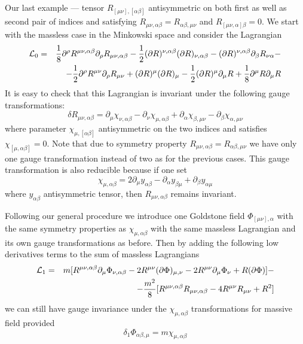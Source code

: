 \documentclass[a4paper,12pt]{article}
\begin{document}
Our last example --- tensor $R_{[\mu\nu],[\alpha\beta]}$ antisymmetric
on both first as well as second pair of indices and satisfying
$R_{\mu\nu,\alpha\beta} = R_{\alpha\beta,\mu\nu}$ and
$R_{[\mu\nu,\alpha]\beta} = 0$. We start with the massless case in the
Minkowski space and consider the Lagrangian
\begin{eqnarray}
{\cal L}_0 &=& \frac{1}{8} \partial^\rho R^{\mu\nu,\alpha\beta}
\partial_\rho R_{\mu\nu,\alpha\beta} - \frac{1}{2}
(\partial R)^{\nu,\alpha\beta} (\partial R)_{\nu,\alpha\beta} -
(\partial R)^{\nu,\alpha\beta} \partial_\beta R_{\nu\alpha} -
\nonumber \\
 && - \frac{1}{2} \partial^\rho R^{\mu\nu} \partial_\rho R_{\mu\nu} +
 (\partial R)^\mu (\partial R)_\mu - \frac{1}{2} (\partial R)^\mu
 \partial_\mu R + \frac{1}{8} \partial^\mu R \partial_\mu R
\end{eqnarray}
It is easy to check that this Lagrangian is invariant under the
following gauge transformations:
\begin{equation}
\delta R_{\mu\nu,\alpha\beta} = \partial_\mu \chi_{\nu,\alpha\beta}
- \partial_\nu \chi_{\mu,\alpha\beta} + \partial_\alpha
\chi_{\beta,\mu\nu} - \partial_\beta \chi_{\alpha,\mu\nu}
\end{equation}
where parameter $\chi_{\mu,[\alpha\beta]}$ antisymmetric on the two
indices and satisfies $\chi_{[\mu,\alpha\beta]} = 0$. Note that due to
symmetry property $R_{\mu\nu,\alpha\beta} = R_{\alpha\beta,\mu\nu}$
we have only one gauge transformation instead of two as for the
previous cases. This gauge transformation is also reducible because
if one set
\begin{equation}
\chi_{\mu,\alpha\beta} = 2 \partial_\mu y_{\alpha\beta} - \partial_\alpha
y_{\beta\mu} + \partial_\beta y_{\alpha\mu}
\end{equation}
where $y_{\alpha\beta}$ antisymmetric tensor, then $R_{\mu\nu,\alpha\beta}$
remains invariant.

Following our general procedure we introduce one Goldstone field
$\Phi_{[\mu\nu],\alpha}$ with the same symmetry properties as
$\chi_{\mu,\alpha\beta}$ with the same massless Lagrangian and its
own gauge transformations as before. Then by adding the following
low derivatives terms to the sum of massless Lagrangians
\begin{eqnarray}
{\cal L}_1 &=& m [ R^{\mu\nu,\alpha\beta} \partial_\mu \Phi_{\nu,\alpha\beta}
- 2 R^{\mu\nu} (\partial \Phi)_{\mu,\nu} - 2 R^{\mu\nu} \partial_\mu
\Phi_\nu + R (\partial \Phi) ] - \nonumber \\
 && - \frac{m^2}{8} [ R^{\mu\nu,\alpha\beta} R_{\mu\nu,\alpha\beta}
 - 4 R^{\mu\nu} R_{\mu\nu} + R^2]
\end{eqnarray}
we can still have gauge invariance under the $\chi_{\mu,\alpha\beta}$
transformations for massive field provided
\begin{equation}
\delta_1 \Phi_{\alpha\beta,\mu} = m \chi_{\mu,\alpha\beta}
\end{equation}
\end{document}
